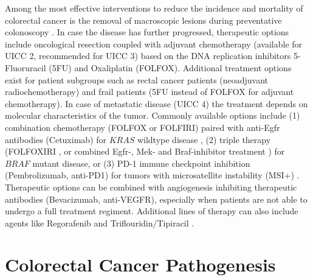 \begin{flushleft}
Among the most effective interventions to reduce the incidence and mortality of colorectal cancer is the removal of macroscopic lesions during preventative colonoscopy \citep{nishiharaLongtermColorectalcancerIncidence2013}. In case the disease has further progressed, therapeutic options include oncological resection coupled with adjuvant chemotherapy (available for UICC 2, recommended for UICC 3) based on the DNA replication inhibitors 5-Fluoruracil (5FU) and Oxaliplatin (FOLFOX). Additional treatment options exist for patient subgroups such as rectal cancer patients (neoadjuvant radiochemotherapy) and frail patients (5FU instead of FOLFOX for adjuvant chemotherapy). In case of metastatic disease (UICC 4) the treatment depends on molecular characteristics of the tumor. Commonly available options include (1) combination chemotherapy (FOLFOX or FOLFIRI) paired with anti-Egfr antibodies (Cetuximab) for $KRAS$ wildtype disease \citep{vancutsemESMOConsensusGuidelines2016a}, (2) triple therapy (FOLFOXIRI \citep{vancutsemESMOConsensusGuidelines2016a}, or combined Egfr-, Mek- and Braf-inhibitor treatment \citep{kopetzEncorafenibBinimetinibCetuximab2019}) for $BRAF$ mutant disease, or (3) PD-1 immune checkpoint inhibition (Pembrolizumab, anti-PD1) for tumors with microsatellite instability (MSI+) \citep{andrePembrolizumabMicrosatelliteInstabilityHighAdvanced2020}. Therapeutic options can be combined with angiogenesis inhibiting therapeutic antibodies (Bevacizumab, anti-VEGFR), especially when patients are not able to undergo a full treatment regiment. Additional lines of therapy can also include agents like Regorafenib and Triflouridin/Tipiracil \citep{vancutsemESMOConsensusGuidelines2016a}. 
\par

\section{Colorectal Cancer Pathogenesis}


\end{flushleft}

